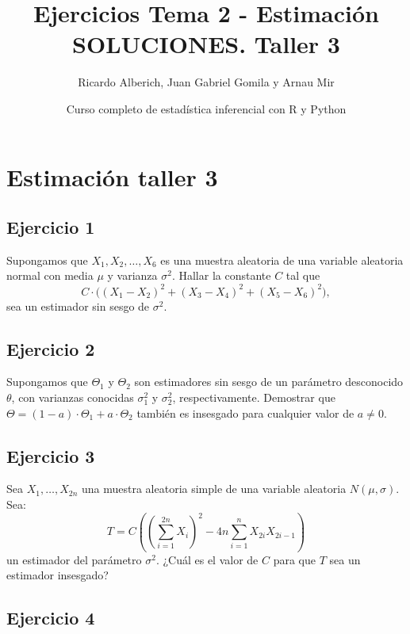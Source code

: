 \documentclass[
]{article}
\title{Ejercicios Tema 2 - Estimación SOLUCIONES. Taller 3}
\author{Ricardo Alberich, Juan Gabriel Gomila y Arnau Mir}
\date{Curso completo de estadística inferencial con R y Python}
\begin{document}
\maketitle

{
\hypersetup{linkcolor=blue}
\setcounter{tocdepth}{2}
\tableofcontents
}
\hypertarget{estimaciuxf3n-taller-3}{%
\section{Estimación taller 3}\label{estimaciuxf3n-taller-3}}

\hypertarget{ejercicio-1}{%
\subsection{Ejercicio 1}\label{ejercicio-1}}

Supongamos que \(X_1,X_2,\ldots,X_6\) es una muestra aleatoria de una
variable aleatoria normal con media \(\mu\) y varianza \(\sigma^2\).
Hallar la constante \(C\) tal que
\[C\cdot\bigl({(X_1 -X_2)}^2 +{(X_3 -X_4)}^2 + 
 {(X_5 -X_6)}^2\bigr),\] sea un estimador sin sesgo de \(\sigma^2\).

\hypertarget{ejercicio-2}{%
\subsection{Ejercicio 2}\label{ejercicio-2}}

Supongamos que \(\Theta_1\) y \(\Theta_2\) son estimadores sin sesgo de
un parámetro desconocido \(\theta\), con varianzas conocidas
\(\sigma_1^2\) y \(\sigma_2^2\), respectivamente. Demostrar que
\(\Theta =(1-a)\cdot\Theta_1 +a\cdot \Theta_2\) también es insesgado
para cualquier valor de \(a\not=0\).

\hypertarget{ejercicio-3}{%
\subsection{Ejercicio 3}\label{ejercicio-3}}

Sea \(X_1,\ldots,X_{2n}\) una muestra aleatoria simple de una variable
aleatoria \(N(\mu,\sigma)\). Sea: \[
T=C\left({\left(\sum_{i=1}^{2n} X_i\right)}^2- 4 n\sum_{i=1}^{n}
X_{2i} X_{2i-1}\right)
\] un estimador del parámetro \(\sigma^2\). ¿Cuál es el valor de \(C\)
para que \(T\) sea un estimador insesgado?

\hypertarget{ejercicio-4}{%
\subsection{Ejercicio 4}\label{ejercicio-4}}
\end{document}
